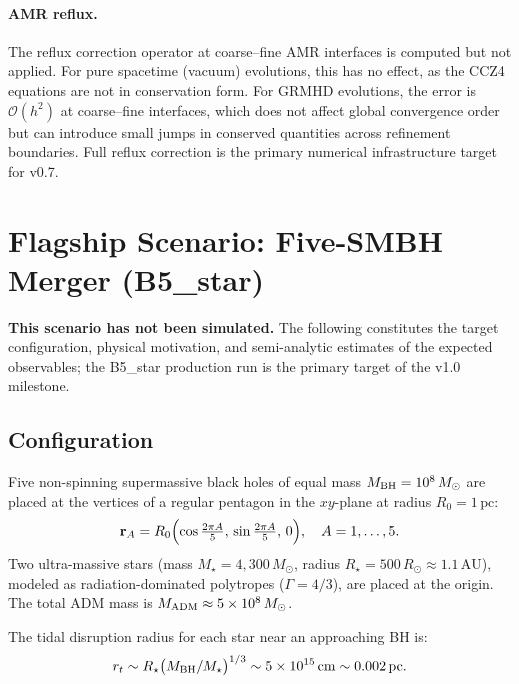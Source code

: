 \documentclass[aps,prd,twocolumn,superscriptaddress,nofootinbib,showpacs,
               longbibliography]{revtex4-2}
\newcommand{\order}[1]{\mathcal{O}(#1)}
\newcommand{\Msun}{M_\odot}
\newcommand{\Rsun}{R_\odot}
\begin{document}
\paragraph{AMR reflux.}
The reflux correction operator at coarse--fine AMR interfaces is computed
but not applied.
For pure spacetime (vacuum) evolutions, this has no effect, as the CCZ4
equations are not in conservation form.
For GRMHD evolutions, the error is $\order{h^2}$ at coarse--fine interfaces,
which does not affect global convergence order but can introduce small
jumps in conserved quantities across refinement boundaries.
Full reflux correction is the primary numerical infrastructure target for v0.7.

\section{Flagship Scenario: Five-SMBH Merger (B5\_star)}
\label{sec:flagship}

\textbf{This scenario has not been simulated.} The following constitutes the
target configuration, physical motivation, and semi-analytic estimates of the
expected observables; the B5\_star production run is the primary target of
the v1.0 milestone.

\subsection{Configuration}
\label{sec:b5_config}

Five non-spinning supermassive black holes of equal mass
$M_{\rm BH} = 10^8\,\Msun$ are placed at the vertices of a regular
pentagon in the $xy$-plane at radius $R_0 = 1\,\text{pc}$:
\begin{equation}
  \mathbf{r}_A = R_0\Bigl(\cos\tfrac{2\pi A}{5},\,\sin\tfrac{2\pi A}{5},\,0\Bigr),
  \quad A = 1,\ldots,5.
\end{equation}
Two ultra-massive stars (mass $M_\star = 4{,}300\,\Msun$, radius
$R_\star = 500\,\Rsun \approx 1.1\,\text{AU}$), modeled as
radiation-dominated polytropes ($\Gamma = 4/3$), are placed at the origin.
The total ADM mass is $M_{\rm ADM} \approx 5\times10^8\,\Msun$.

The tidal disruption radius for each star near an approaching BH is:
\begin{equation}
  r_t \sim R_\star\bigl(M_{\rm BH}/M_\star\bigr)^{1/3}
    \sim 5\times10^{15}\,\text{cm} \sim 0.002\,\text{pc}.
\end{equation}
\end{document}

